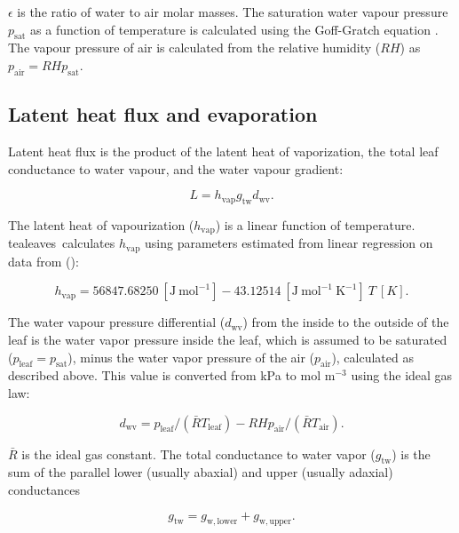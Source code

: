 \documentclass[11pt, oneside]{article}
\newcommand{\pkg}[1]{{\fontseries{b}\selectfont #1}}
\newcommand{\tealeaves}{\pkg{tealeaves}}
\begin{document}
$\epsilon$ is the ratio of water to air molar masses. The saturation water vapour pressure $p_\mathrm{sat}$ as a function of temperature is calculated using the Goff-Gratch equation \citep{Vomel_2016}. The vapour pressure of air is calculated from the relative humidity ($\mathit{RH}$) as $p_\mathrm{air} = \mathit{RH} p_\mathrm{sat}$.

\subsection*{Latent heat flux and evaporation}

Latent heat flux is the product of the latent heat of vaporization, the total leaf conductance to water vapour, and the water vapour gradient:

\begin{equation}
  L = h_\mathrm{vap} g_\mathrm{tw} d_\mathrm{wv}.
\end{equation}

The latent heat of vapourization ($h_\mathrm{vap}$) is a linear function of temperature. \tealeaves~calculates $h_\mathrm{vap}$ using parameters estimated from linear regression on data from \citeauthor{Nobel_2009} (\citeyear{Nobel_2009}):

\begin{equation}
  h_\mathrm{vap} = 56847.68250~[\mathrm{J~mol}^{-1}] - 43.12514~[\mathrm{J~mol}^{-1}~\mathrm{K}^{-1}]~T~[K].
\end{equation}

The water vapour pressure differential ($d_\mathrm{wv}$) from the inside to the outside of the leaf is the water vapor pressure inside the leaf, which is assumed to be saturated ($p_\mathrm{leaf} = p_\mathrm{sat}$), minus the water vapor pressure of the air ($p_\mathrm{air}$), calculated as described above. This value is converted from kPa to mol m$^{-3}$ using the ideal gas law:

\begin{equation}
  \label{eq:d_wv}
  d_\mathrm{wv} = p_\mathrm{leaf} / (\bar{R} T_\mathrm{leaf}) - RH p_\mathrm{air} / (\bar{R} T_\mathrm{air}).
\end{equation}

$\bar{R}$ is the ideal gas constant. The total conductance to water vapor ($g_\mathrm{tw}$) is the sum of the parallel lower (usually abaxial) and upper (usually adaxial) conductances

\begin{equation}
  \label{eq:g_tw}
  g_\mathrm{tw} = g_\mathrm{w,lower} + g_\mathrm{w,upper}.
\end{equation} 
\end{document}
